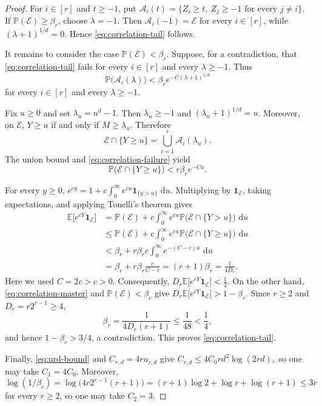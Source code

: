 \documentclass[twoside,12pt]{article}
\theoremstyle{definition}
\theoremstyle{remark}
\newcommand{\E}{\mathbb E}
\newcommand{\Pp}{\mathbb P}
\newcommand{\1}{\mathbf 1}
\newcommand{\dd}{\,\mathrm d}
\begin{document}
\begin{proof}
For $i\in[r]$ and $t\ge-1$, put
$
 \mathcal A_i(t)
 =\{Z_i\ge t,\ Z_j\ge-1\text{ for every }j\ne i\}.
$
If $\Pp(\mathcal E)\ge\beta_r$, choose $\lambda=-1$. Then
$\mathcal A_i(-1)=\mathcal E$ for every $i\in[r]$, while
$(\lambda+1)^{1/d}=0$. Hence \eqref{eq:correlation-tail} follows.

It remains to consider the case $\Pp(\mathcal E)<\beta_r$. Suppose, for a
contradiction, that \eqref{eq:correlation-tail} fails for every $i\in[r]$
and every $\lambda\ge-1$. Thus
\begin{equation}\label{eq:correlation-failure}
 \Pp\bigl(\mathcal A_i(\lambda)\bigr)
 <\beta_re^{-C(\lambda+1)^{1/d}}
\end{equation}
for every $i\in[r]$ and every $\lambda\ge-1$.

Fix $u\ge0$ and set $\lambda_u=u^d-1$. Then $\lambda_u\ge-1$ and
$(\lambda_u+1)^{1/d}=u$. Moreover, on $\mathcal E$,
 $Y\ge u$ if and only if
 $M\ge\lambda_u$.
Therefore
\[
 \mathcal E\cap\{Y\ge u\}
 =\bigcup_{i=1}^r\mathcal A_i(\lambda_u).
\]
The union bound and \eqref{eq:correlation-failure} yield
\begin{equation}\label{eq:correlation-Y-tail}
 \Pp\bigl(\mathcal E\cap\{Y\ge u\}\bigr)
 <r\beta_re^{-Cu}.
\end{equation}

For every $y\ge0$,
$e^{cy}=1+c\int_0^\infty e^{cu}\1_{\{y>u\}}\,\dd u.$
Multiplying by $\1_{\mathcal E}$, taking expectations, and applying
Tonelli's theorem gives
\begin{align*}
 \E\bigl[e^{cY}\1_{\mathcal E}\bigr]
 &=\Pp(\mathcal E)
 +c\int_0^\infty e^{cu}
 \Pp\bigl(\mathcal E\cap\{Y>u\}\bigr)\,\dd u\\
 &\le\Pp(\mathcal E)
 +c\int_0^\infty e^{cu}
 \Pp\bigl(\mathcal E\cap\{Y\ge u\}\bigr)\,\dd u\\
 &<\beta_r+r\beta_rc
 \int_0^\infty e^{-(C-c)u}\,\dd u\\
 &=\beta_r+r\beta_r\frac{c}{C-c}
 =(r+1)\beta_r
 =\frac1{4D_r}.
\end{align*}
Here we used $C=2c>c>0$. Consequently,
$D_r\E\bigl[e^{cY}\1_{\mathcal E}\bigr]<\frac14$.
On the other hand, \eqref{eq:correlation-master} and
$\Pp(\mathcal E)<\beta_r$ give
$D_r\E\bigl[e^{cY}\1_{\mathcal E}\bigr]
 >1-\beta_r$.
Since $r\ge2$ and $D_r=r2^{r-1}\ge4$,
\[
 \beta_r=\frac1{4D_r(r+1)}\le\frac1{48}<\frac14,
\]
and hence $1-\beta_r>3/4$, a contradiction. This proves
\eqref{eq:correlation-tail}.

Finally, \eqref{eq:urd-bound} and $C_{r,d}=4ru_{r,d}$ give
$C_{r,d}\le4C_0rd^2\log(2rd),$
so one may take $C_1=4C_0$. Moreover,
\[
 \log(1/\beta_r)
 =\log\bigl(4r2^{r-1}(r+1)\bigr)
 =(r+1)\log2+\log r+\log(r+1)
 \le3r
\]
for every $r\ge2$, so one may take $C_2=3$.
\end{proof}
\end{document}
